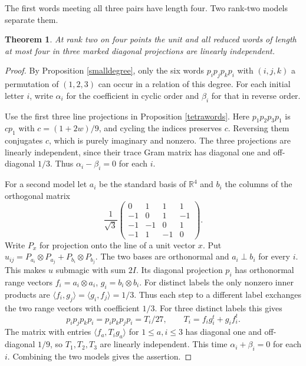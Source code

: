 \documentclass[11pt,a4paper]{article}
\newtheorem{thm}{Theorem}[section]
\begin{document}
The first words meeting all three pairs have length four. Two rank-two models separate them.

\begin{thm}\label{fourletters}
At rank two on four points the unit and all reduced words of length at most four in three marked diagonal projections are linearly independent.
\end{thm}
\begin{proof}
By Proposition \ref{smalldegree}, only the six words $p_i p_j p_k p_i$ with $(i,j,k)$ a permutation of $(1,2,3)$ can occur in a relation of this degree. For each initial letter $i$, write $\alpha_i$ for the coefficient in cyclic order and $\beta_i$ for that in reverse order.

Use the first three line projections in Proposition \ref{tetrawords}. Here $p_1p_2p_3p_1$ is $c p_1$ with $c=(1+2w)/9$, and cycling the indices preserves $c$. Reversing them conjugates $c$, which is purely imaginary and nonzero. The three projections are linearly independent, since their trace Gram matrix has diagonal one and off-diagonal $1/3$. Thus $\alpha_i-\beta_i=0$ for each $i$.

For a second model let $a_i$ be the standard basis of $\mathbb R^4$ and $b_i$ the columns of the orthogonal matrix
\[
 \frac{1}{\sqrt3}
 \begin{pmatrix}
 0&1&1&1\\-1&0&1&-1\\-1&-1&0&1\\-1&1&-1&0
 \end{pmatrix}.
\]
Write $P_x$ for projection onto the line of a unit vector $x$. Put $u_{ij}=P_{a_i}\otimes P_{a_j}+P_{b_i}\otimes P_{b_j}$. The two bases are orthonormal and $a_i\perp b_i$ for every $i$. This makes $u$ submagic with sum $2I$. Its diagonal projection $p_i$ has orthonormal range vectors $f_i=a_i\otimes a_i$, $g_i=b_i\otimes b_i$. For distinct labels the only nonzero inner products are $\langle f_i,g_j\rangle=\langle g_i,f_j\rangle=1/3$. Thus each step to a different label exchanges the two range vectors with coefficient $1/3$. For three distinct labels this gives
\[
 p_i p_j p_k p_i=p_i p_k p_j p_i=T_i/27,
 \qquad T_i=f_i g_i^t+g_i f_i^t .
\]
The matrix with entries $\langle f_a,T_i g_a\rangle$ for $1\leq a,i\leq3$ has diagonal one and off-diagonal $1/9$, so $T_1,T_2,T_3$ are linearly independent. This time $\alpha_i+\beta_i=0$ for each $i$. Combining the two models gives the assertion.
\end{proof}
\end{document}
